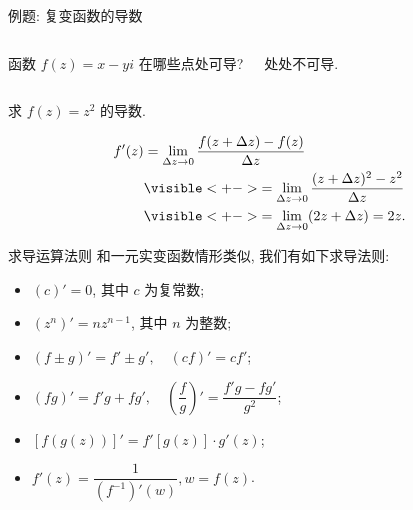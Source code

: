 \begin{frame}[<*>]{例题: 复变函数的导数}
\onslide<+->
\begin{columns}
		\begin{exercise}
		函数 $f(z)=x-yi$ 在哪些点处可导? 
		\end{exercise}\onslide<+->
		\begin{answer}
		处处不可导.
		\end{answer}
\end{columns}
\onslide<+->
\begin{example}
求 $f(z)=z^2$ 的导数.
\end{example}
\onslide<+->
\begin{solution}
\vspace{-\baselineskip}
\begin{align*}
f'(z)&=\lim_{\Delta z\to 0}\frac{f(z+\Delta z)-f(z)}{\Delta z}\\
&\visible<+->{=\lim_{\Delta z\to 0}\frac{(z+\Delta z)^2-z^2}{\Delta z}}\\
&\visible<+->{=\lim_{\Delta z\to 0}(2z+\Delta z)=2z.}
\end{align*}
\end{solution}
\end{frame}


\begin{frame}{求导运算法则}
\onslide<+->
和一元实变函数情形类似, 我们有如下求导法则:
\begin{theorem}
\begin{itemize}
\item $(c)'=0$, 其中 $c$ 为复常数;
\item $(z^n)'=nz^{n-1}$, 其中 $n$ 为整数;
\item $(f\pm g)'=f'\pm g',\quad (cf)'=cf'$;
\item $(fg)'=f'g+fg',\quad \left(\dfrac fg\right)'=\dfrac{f'g-fg'}{g^2}$;
\item $[f(g(z))]'=f'[g(z)]\cdot g'(z)$;
\item $f'(z)=\dfrac1{(f^{-1})'(w)}, w=f(z)$.
\end{itemize}
\end{theorem}
\end{frame}


